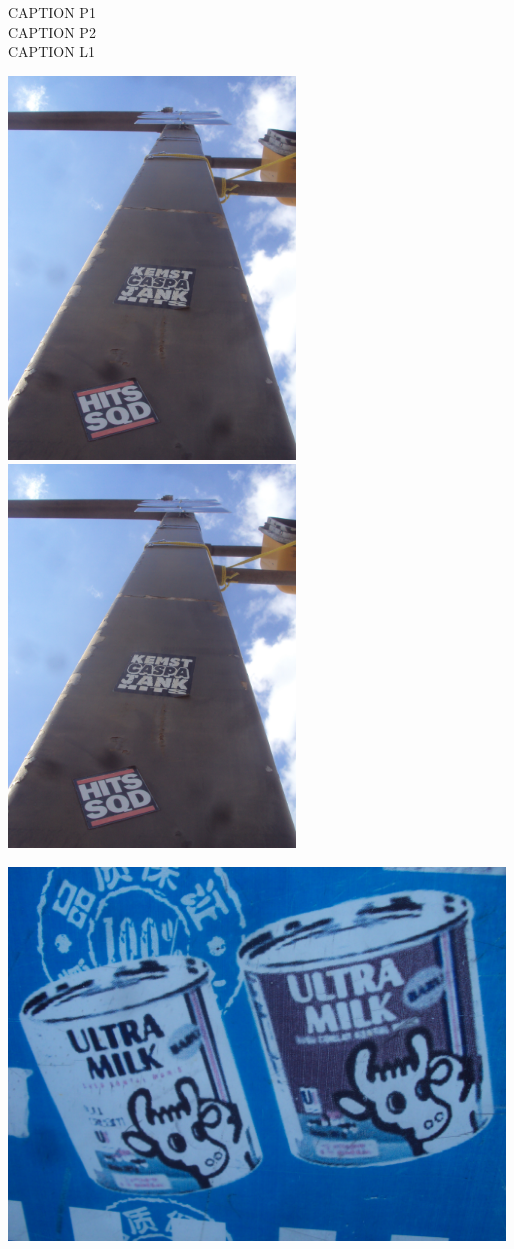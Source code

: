 \documentclass[10pt,letterpaper]{article}
\begin{document}
CAPTION P1\\
CAPTION P2\\
CAPTION L1\\
\pagebreak

\includegraphics[height=4in]{portrait.jpg}
\includegraphics[height=4in]{portrait.jpg}

\vspace{0.25in}
\includegraphics[width=5.19in]{landscape.jpg}
\end{document}
